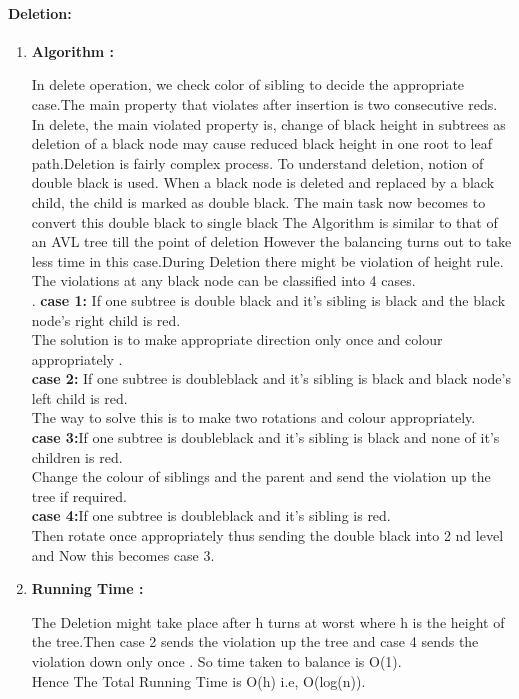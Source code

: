 \documentclass[a4paper,11pt]{article}
\begin{document}
\paragraph{Deletion:}
\begin{enumerate}
\item \textbf{Algorithm :}

In delete operation, we check color of sibling to decide the appropriate case.The main property that violates after insertion is two consecutive reds. In delete, the main violated property is, change of black height in subtrees as deletion of a black node may cause reduced black height in one root to leaf path.Deletion is fairly complex process.  To understand deletion, notion of double black is used.  When a black node is deleted and replaced by a black child, the child is marked as double black. The main task now becomes to convert this double black to single black
The Algorithm is similar to that of an AVL tree till the point of deletion  However the balancing turns out to take less time in this case.During Deletion there might be violation of height rule.\\
The violations at any black node can be classified into 4 cases.\\

.
\textbf{case 1:}
    If one subtree is double black and it's sibling is  black
and the black node's right child is red.\\
The solution is to make appropriate direction only once and colour appropriately .\\

\textbf{case 2:} 
    If one subtree is doubleblack and it's sibling is  black
and black node's left child is red.\\
The way to solve this is to make two rotations and colour appropriately.\\

\textbf{case 3:}If one subtree is doubleblack and it's sibling is  black
and none of it's children is red.\\
Change the colour of siblings and the parent and send the violation up the tree if required.\\

\textbf{case 4:}If one subtree is doubleblack and it's sibling is  red.\\
Then rotate once appropriately thus sending the double black into 2 nd level and Now this becomes case 3.

\item \textbf{Running Time :}

 The Deletion might take place after h turns at worst where h is the height of the tree.Then  case 2 sends the violation  up the tree and case 4 sends the violation down only once . So time taken to balance is O(1).\\
 Hence The Total Running Time is O(h) i.e, O(log(n)).\\
 
 
\end{enumerate}
\end{document}
